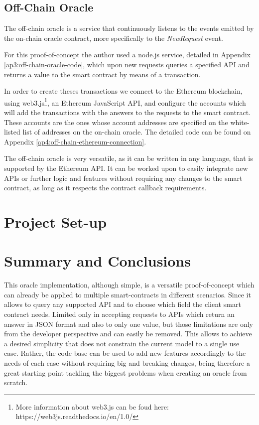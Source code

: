 \subsection{Off-Chain Oracle}

The off-chain oracle is a service that continuously listens to the events emitted by the on-chain oracle contract, more specifically to the \textit{NewRequest} event.

For this proof-of-concept the author used a node.js service, detailed in Appendix \ref{ap3:off-chain-oracle-code}, which upon new requests queries a specified API and returns a value to the smart contract by means of a transaction.

In order to create theses transactions we connect to the Ethereum blockchain, using web3.js\footnote{More information about web3.js can be foud here: https://web3js.readthedocs.io/en/1.0/}, an Ethereum JavaScript API, and configure the accounts which will add the transactions with the answers to the requests to the smart contract. These accounts are the ones whose account addresses are specified on the white-listed list of addresses on the on-chain oracle. The detailed code can be found on Appendix \ref{ap4:off-chain-ethereum-connection}.

The off-chain oracle is very versatile, as it can be written in any language, that is supported by the Ethereum API. It can be worked upon to easily integrate new APIs or further logic and features without requiring any changes to the smart contract, as long as it respects the contract callback requirements.

\section{Project Set-up}

\section{Summary and Conclusions}

This oracle implementation, although simple, is a versatile proof-of-concept which can already be applied to multiple smart-contracts in different scenarios. Since it allows to query any supported API and to choose which field the client smart contract needs. Limited only in accepting requests to APIs which return an answer in JSON format and also to only one value, but those limitations are only from the developer perspective and can easily be removed. This allows to achieve a desired simplicity that does not constrain the current model to a single use case. Rather, the code base can be used to add new features accordingly to the needs of each case without requiring big and breaking changes, being therefore a great starting point tackling the biggest problems when creating an oracle from scratch.

